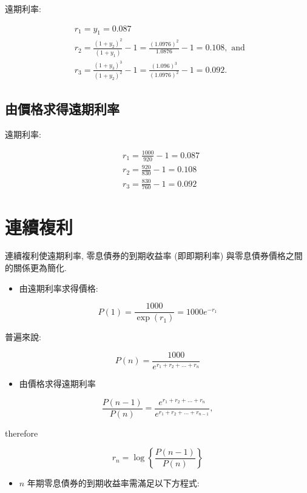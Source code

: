 \documentclass[letterpaper]{article}
\begin{document}
		
		遠期利率: 
		
		$$
		\begin{aligned}
			& r_{1}=y_{1}=0.087 \\
			& r_{2}=\frac{\left (1+y_{2}\right) ^{2}}{\left (1+y_{1}\right) }-1=\frac{ (1.0976) ^{2}}{1.0876}-1=0.108, \text { and } \\
			& r_{3}=\frac{\left (1+y_{3}\right) ^{3}}{\left (1+y_{2}\right) ^{2}}-1=\frac{ (1.096) ^{3}}{ (1.0976) ^{2}}-1=0.092 .
		\end{aligned}
		$$
		
		\subsection{由價格求得遠期利率}
		
		遠期利率: 
		
		$$
		\begin{aligned}
			& r_{1}=\frac{1000}{920}-1=0.087 \\
			& r_{2}=\frac{920}{830}-1=0.108 \\
			& r_{3}=\frac{830}{760}-1=0.092
		\end{aligned}
		$$
		
		\section{連續複利}
		連續複利使遠期利率, 零息債券的到期收益率 (即即期利率) 與零息債券價格之間的關係更為簡化.  
		
		\begin{itemize}
			\item 由遠期利率求得價格: 
		\end{itemize}
		
		$$
		P (1) =\frac{1000}{\exp \left (r_{1}\right) }=1000 e^{-r_{1}}
		$$
		
		普遍來說: 
		
		$$
		P (n) =\frac{1000}{e^{r_{1}+r_{2}+\ldots+r_{n}}}
		$$
		
		\begin{itemize}
			\item 由價格求得遠期利率
		\end{itemize}
		
		$$
		\frac{P (n-1) }{P (n) }=\frac{e^{r_{1}+r_{2}+\ldots+r_{n}}}{e^{r_{1}+r_{2}+\ldots+r_{n-1}}}, 
		$$
		
		therefore
		
		$$
		r_{n}=\log \left\{\frac{P (n-1) }{P (n) }\right\}
		$$
		
		\begin{itemize}
			\item $n$ 年期零息債券的到期收益率需滿足以下方程式: 
		\end{itemize}
		
\end{document}

